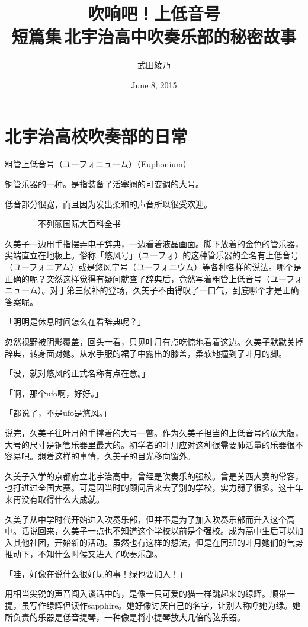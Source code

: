 \documentclass[UTF8]{ctexart}
\title{吹响吧！上低音号\\ \Large{短篇集\,北宇治高中吹奏乐部的秘密故事}}
\date{June 8, 2015}
\author{武田綾乃}
\begin{document}
    \maketitle
    \tableofcontents
    \section{北宇治高校吹奏部的日常}
    粗管上低音号（ユーフォニューム）（Euphonium）

    铜管乐器的一种。是指装备了活塞阀的可变调的大号。

    低音部分很宽，而且因为发出柔和的声音所以很受欢迎。

    ————不列颠国际大百科全书

    久美子一边用手指摆弄电子辞典，一边看着液晶画面。脚下放着的金色的管乐器，尖端直立在地板上。俗称「悠风号」（ユーフォ）的这种管乐器的全名有上低音号（ユーフォニアム）或是悠风宁号（ユーフォニウム）等各种各样的说法。哪个是正确的呢？突然这样觉得有疑问就查了辞典后，竟然写着粗管上低音号（ユーフォニューム）。对于第三候补的登场，久美子不由得叹了一口气，到底哪个才是正确答案呢。

    「明明是休息时间怎么在看辞典呢？」

    忽然视野被阴影覆盖，回头一看，只见叶月有点吃惊地看着这边。久美子默默关掉辞典，转身面对她。从水手服的裙子中露出的膝盖，柔软地撞到了叶月的脚。

    「没，就对悠风的正式名称有点在意。」

    「啊，那个ufo啊，好好。」

    「都说了，不是ufo是悠风。」

    说完，久美子往叶月的手撑着的大号一瞥。作为久美子担当的上低音号的放大版，大号的尺寸是铜管乐器里最大的。初学者的叶月应对这种很需要肺活量的乐器很不容易吧。想着这样的事情，久美子的目光移向窗外。

    久美子入学的京都府立北宇治高中，曾经是吹奏乐的强校。曾是关西大赛的常客，也打进过全国大赛。可是因当时的顾问后来去了别的学校，实力弱了很多。这十年来再没有取得什么大成就。

    久美子从中学时代开始进入吹奏乐部，但并不是为了加入吹奏乐部而升入这个高中。话说回来，久美子一点也不知道这个学校以前是个强校。成为高中生后可以加入其他社团，开始新的活动。虽然也有这样的想法，但是在同班的叶月她们的气势推动下，不知什么时候又进入了吹奏乐部。

    「哇，好像在说什么很好玩的事！绿也要加入！」

    用相当尖锐的声音闯入谈话中的，是像一只可爱的猫一样跳起来的绿辉。顺带一提，虽写作绿辉但读作sapphire。她好像讨厌自己的名字，让别人称呼她为绿。她所负责的乐器是低音提琴，一种像是将小提琴放大几倍的弦乐器。
\end{document}

